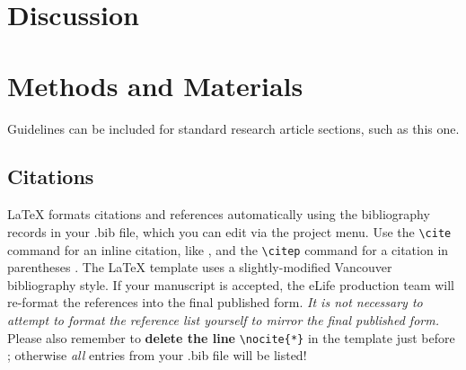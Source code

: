 \documentclass[9pt,lineno]{elife}
\begin{document}





\section{Discussion}

\lipsum[9]

\section{Methods and Materials}

Guidelines can be included for standard research article sections, such as this one. 

\lipsum[3]





\subsection{Citations}

LaTeX formats citations and references automatically using the bibliography records in your .bib file, which you can edit via the project menu. Use the \verb|\cite| command for an inline citation, like \cite{Aivazian917}, and the \verb|\citep| command for a citation in parentheses \citep{Aivazian917}. The LaTeX template uses a slightly-modified Vancouver bibliography style. If your manuscript is accepted, the eLife production team will re-format the references into the final published form. \emph{It is not necessary to attempt to format the reference list yourself to mirror the final published form.} Please also remember to \textbf{delete the line} \verb|\nocite{*}| in the template just before \verb||; otherwise \emph{all} entries from your .bib file will be listed! 


\end{document}
